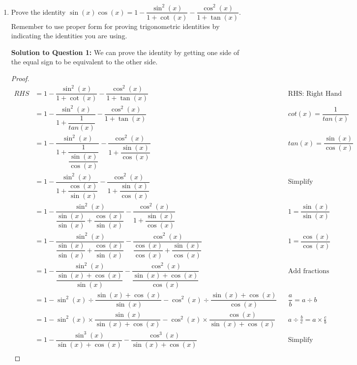 \documentclass[12pt]{book}
\begin{document}
\begin{enumerate}

\item Prove the identity $\sin(x)\cos(x)=1-\dfrac{\sin^2(x)}{1+\cot(x)}-\dfrac{\cos^2(x)}{1+\tan(x)}$. Remember to use proper form for proving trigonometric identities by indicating the identities you are using.

\vspace{-0.4cm}
\textbf{Solution to Question 1:}
We can prove the identity by getting one side of the equal sign to be equivalent to the other side.
\vspace{-3cm}

\begin{proof}
\addtolength{\jot}{1em}
\begin{align*}
    RHS &= 1-\dfrac{\sin^2(x)}{1+\cot(x)}-\dfrac{\cos^2(x)}{1+\tan(x)} && \text{RHS: Right Hand Side} \\
    &= 1-\dfrac{\sin^2(x)}{1+\dfrac{1}{tan(x)}}-\dfrac{\cos^2(x)}{1+\tan(x)} && cot(x) = \dfrac{1}{tan(x)} \\
    &= 1-\dfrac{\sin^2(x)}{1+\dfrac{1}{\dfrac{\sin(x)}{\cos(x)}}}-\dfrac{\cos^2(x)}{1+\dfrac{\sin(x)}{\cos(x)}} && tan(x) = \dfrac{\sin(x)}{\cos(x)} \\
    &= 1-\dfrac{\sin^2(x)}{1+\dfrac{\cos(x)}{\sin(x)}}-\dfrac{\cos^2(x)}{1+\dfrac{\sin(x)}{\cos(x)}} && \text{Simplify} \\
    &= 1-\dfrac{\sin^2(x)}{\dfrac{\sin(x)}{\sin(x)} +\dfrac{\cos(x)}{\sin(x)}}-\dfrac{\cos^2(x)}{1+\dfrac{\sin(x)}{\cos(x)}} && 1 = \dfrac{\sin(x)}{\sin(x)} \\
    &= 1-\dfrac{\sin^2(x)}{\dfrac{\sin(x)}{\sin(x)} +\dfrac{\cos(x)}{\sin(x)}}-\dfrac{\cos^2(x)}{\dfrac{\cos(x)}{\cos(x)}+\dfrac{\sin(x)}{\cos(x)}} && 1 = \dfrac{\cos(x)}{\cos(x)} \\
    &= 1-\dfrac{\sin^2(x)}{\dfrac{\sin(x) + \cos(x)}{\sin(x)}}-\dfrac{\cos^2(x)}{\dfrac{\sin(x) + \cos(x)}{\cos(x)}} && \text{Add fractions together} \\
    &= 1-\sin^2(x) \div \dfrac{\sin(x) + \cos(x)}{\sin(x)} - \cos^2(x) \div \dfrac{\sin(x) + \cos(x)}{\cos(x)} && \dfrac{a}{b} = a \div b \\
    &= 1-\sin^2(x) \times \dfrac{\sin(x)}{\sin(x) + \cos(x)} - \cos^2(x) \times \dfrac{\cos(x)}{\sin(x) + \cos(x)} && a \div \frac{b}{c} = a \times \frac{c}{b} \\
    &= 1-\dfrac{\sin^3(x)}{\sin(x) + \cos(x)} - \dfrac{\cos^3(x)}{\sin(x) + \cos(x)} && \text{Simplify} \\
\end{align*}


\end{proof}
\end{enumerate}
\end{document}
